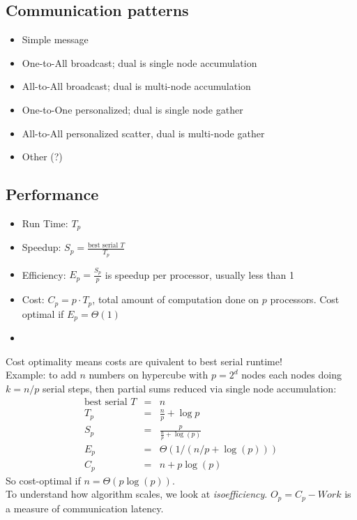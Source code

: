 \documentclass[a4paper,10pt]{article}
\begin{document}
\subsection{Communication patterns}
\begin{itemize}
\item Simple message
\item One-to-All broadcast; dual is single node accumulation
\item All-to-All broadcast;  dual is multi-node accumulation
\item One-to-One personalized; dual is single node gather
\item All-to-All personalized scatter, dual is multi-node gather
\item Other (?)
\end{itemize}

\subsection{Performance}
\begin{itemize}
\item Run Time: $T_p$
\item Speedup: $S_p = \frac{\text{best serial } T}{T_p}$
\item Efficiency: $E_p = \frac{S_p}{p}$ is speedup per processor, usually less than 1
\item Cost: $C_p = p\cdot T_p$, total amount of computation done on $p$ processors.  Cost optimal if $E_p = \Theta(1)$
\item 
\end{itemize}
Cost optimality means costs are quivalent to best serial runtime! \\
Example:  to add $n$ numbers on hypercube with $p=2^d$ nodes each nodes doing $k=n/p$ serial steps, then partial sums reduced via single node accumulation:
\begin{eqnarray}
\text{best serial } T &=& n\\
T_p &=& \frac{n}{p} + \log{p} \\
S_p &=& \frac{p}{\frac{n}{p} + \log(p)} \\
E_p &=& \Theta(1/(n/p + \log(p))) \\
C_p &=& n + p\log(p)
\end{eqnarray}
So cost-optimal if $n = \Theta(p\log(p))$. \\
To understand how algorithm scales, we look at \emph{isoefficiency}.  $O_p = C_p - Work$ is a measure of communication latency.
\end{document}
